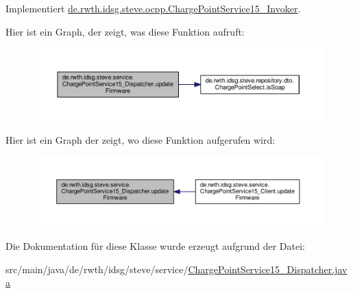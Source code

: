 Implementiert \hyperlink{interfacede_1_1rwth_1_1idsg_1_1steve_1_1ocpp_1_1_charge_point_service15___invoker_a0d6e07d5926073b463a3453dfa8f2a5b}{de.\-rwth.\-idsg.\-steve.\-ocpp.\-Charge\-Point\-Service15\-\_\-\-Invoker}.



Hier ist ein Graph, der zeigt, was diese Funktion aufruft\-:\nopagebreak
\begin{figure}[H]
\begin{center}
\leavevmode
\includegraphics[width=350pt]{classde_1_1rwth_1_1idsg_1_1steve_1_1service_1_1_charge_point_service15___dispatcher_a795a1aa4bb5733b36d280862e910d5fd_cgraph}
\end{center}
\end{figure}




Hier ist ein Graph der zeigt, wo diese Funktion aufgerufen wird\-:\nopagebreak
\begin{figure}[H]
\begin{center}
\leavevmode
\includegraphics[width=350pt]{classde_1_1rwth_1_1idsg_1_1steve_1_1service_1_1_charge_point_service15___dispatcher_a795a1aa4bb5733b36d280862e910d5fd_icgraph}
\end{center}
\end{figure}




Die Dokumentation für diese Klasse wurde erzeugt aufgrund der Datei\-:\begin{DoxyCompactItemize}
\item 
src/main/java/de/rwth/idsg/steve/service/\hyperlink{_charge_point_service15___dispatcher_8java}{Charge\-Point\-Service15\-\_\-\-Dispatcher.\-java}\end{DoxyCompactItemize}

